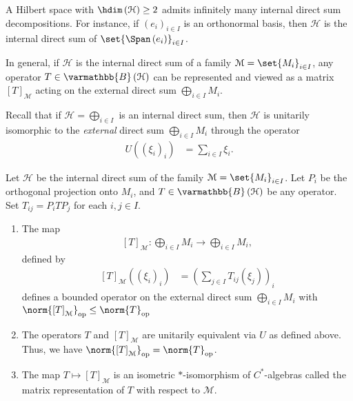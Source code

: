 \documentclass[10pt]{mypackage}
\renewcommand*{\mathbb}[1]{\varmathbb{#1}}
\newcommand{\B}{\mathbb{B}}
\begin{document}
A Hilbert space with $\hdim\left(\mathcal{H}\right) \geq 2$ admits infinitely many internal direct sum decompositions. For instance, if $\left(e_i\right)_{i\in I}$ is an orthonormal basis, then $\mathcal{H}$ is the internal direct sum of $\set{\Span\left(e_i\right)}_{i\in I}$.\newline

In general, if $\mathcal{H}$ is the internal direct sum of a family $\mathcal{M} = \set{M_i}_{i\in I}$, any operator $T\in \B\left(\mathcal{H}\right)$ can be represented and viewed as a matrix $\left[T\right]_{\mathcal{M}}$ acting on the external direct sum $\bigoplus_{i\in I}M_i$.\newline

Recall that if $\mathcal{H} = \bigoplus_{i\in I}$ is an internal direct sum, then $\mathcal{H}$ is unitarily isomorphic to the \textit{external} direct sum $\bigoplus_{i\in I}M_i$ through the operator
\begin{align*}
  U\left(\left(\xi_i\right)_i\right) &= \sum_{i\in I}\xi_i.
\end{align*}
\begin{proposition}
  Let $\mathcal{H}$ be the internal direct sum of the family $\mathcal{M} = \set{M_i}_{i\in I}$. Let $P_i$ be the orthogonal projection onto $M_i$, and $T\in \B\left(\mathcal{H}\right)$ be any operator. Set $T_{ij} = P_iTP_j$ for each $i,j\in I$.
  \begin{enumerate}[(1)]
    \item The map
      \begin{align*}
        \left[T\right]_{\mathcal{M}}: \bigoplus_{i\in I}M_i \rightarrow \bigoplus_{i\in I} M_i,
      \end{align*}
      defined by
      \begin{align*}
        \left[T\right]_{\mathcal{M}}\left(\left(\xi_i\right)_i\right) &= \left(\sum_{j\in I}T_{ij}\left(\xi_j\right)\right)_i
      \end{align*}
      defines a bounded operator on the external direct sum $\bigoplus_{i\in I}M_i$ with $\norm{\left[T\right]_{\mathcal{M}}}_{\text{op}} \leq \norm{T}_{\text{op}}$
    \item The operators $T$ and $\left[T\right]_{\mathcal{M}}$ are unitarily equivalent via $U$ as defined above. Thus, we have $\norm{\left[T\right]_{\mathcal{M}}}_{\text{op}} = \norm{T}_{\text{op}}$.
    \item The map $T \mapsto \left[T\right]_{\mathcal{M}}$ is an isometric $\ast$-isomorphism of $C^{\ast}$-algebras called the matrix representation of $T$ with respect to $\mathcal{M}$.
  \end{enumerate}
\end{proposition}
\end{document}
